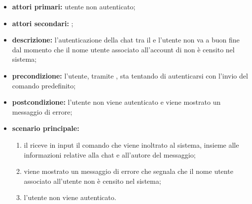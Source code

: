 	\begin{itemize}
		\item \textbf{attori primari:} utente non autenticato;
		\item \textbf{attori secondari:} ;
		\item \textbf{descrizione:} l'autenticazione della chat tra il  e l'utente non va a buon fine dal momento che il nome utente associato all'account di  non è censito nel sistema;
		\item \textbf{precondizione:} l'utente, tramite , sta tentando di autenticarsi con l'invio del comando predefinito;
		\item \textbf{postcondizione:} l'utente non viene autenticato e viene mostrato un messaggio di errore;
		\item \textbf{scenario principale:}
		\begin{enumerate}
			\item il   riceve in input il comando che viene inoltrato al sistema, insieme alle informazioni relative alla chat e all'autore del messaggio;
			\item viene mostrato un messaggio di errore che segnala che il nome utente associato all'utente  non è censito nel sistema;
			\item l'utente non viene autenticato.
		\end{enumerate}
	\end{itemize}
